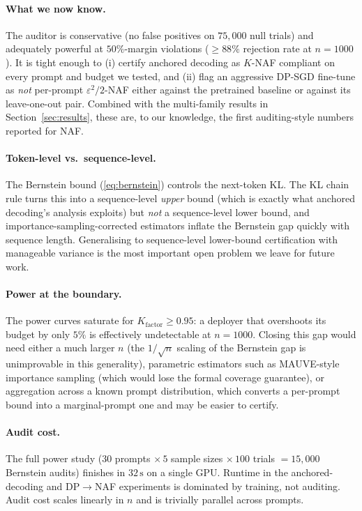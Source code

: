 \documentclass{article}
\begin{document}
\paragraph{What we now know.}
The auditor is conservative (no false positives on $75{,}000$ null trials) and adequately powerful at $50\%$-margin violations ($\ge 88\%$ rejection rate at $n=1000$).  It is tight enough to (i) certify anchored decoding as $K$-NAF compliant on every prompt and budget we tested, and (ii) flag an aggressive DP-SGD fine-tune as \emph{not} per-prompt $\varepsilon^2/2$-NAF either against the pretrained baseline or against its leave-one-out pair.  Combined with the multi-family results in Section~\ref{sec:results}, these are, to our knowledge, the first auditing-style numbers reported for NAF.

\paragraph{Token-level vs.\ sequence-level.}
The Bernstein bound (\ref{eq:bernstein}) controls the next-token KL.  The KL chain rule \cite[Thm.~3.1]{he2026anchored} turns this into a sequence-level \emph{upper} bound (which is exactly what anchored decoding's analysis exploits) but \emph{not} a sequence-level lower bound, and importance-sampling-corrected estimators inflate the Bernstein gap quickly with sequence length.  Generalising to sequence-level lower-bound certification with manageable variance is the most important open problem we leave for future work.

\paragraph{Power at the boundary.}
The power curves saturate for $K_{\mathrm{factor}}\ge 0.95$: a deployer that overshoots its budget by only $5\%$ is effectively undetectable at $n=1000$.  Closing this gap would need either a much larger $n$ (the $1/\sqrt n$ scaling of the Bernstein gap is unimprovable in this generality), parametric estimators such as MAUVE-style importance sampling (which would lose the formal coverage guarantee), or aggregation across a known prompt distribution, which converts a per-prompt bound into a marginal-prompt one and may be easier to certify.

\paragraph{Audit cost.}
The full power study ($30$ prompts $\times\,5$ sample sizes $\times\,100$ trials $=15{,}000$ Bernstein audits) finishes in $32\,\mathrm{s}$ on a single GPU.  Runtime in the anchored-decoding and DP$\to$NAF experiments is dominated by training, not auditing.  Audit cost scales linearly in $n$ and is trivially parallel across prompts.
\end{document}
